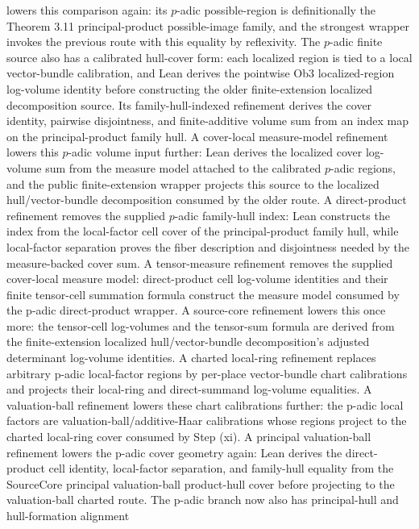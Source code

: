 \begin{proposition}
  lowers this comparison again: its \(p\)-adic possible-region is definitionally
  the Theorem 3.11 principal-product possible-image family, and the strongest
  wrapper invokes the previous route with this equality by reflexivity.  The
  \(p\)-adic finite source also has a calibrated hull-cover form: each
  localized region is tied to a local vector-bundle calibration, and Lean
  derives the pointwise Ob3 localized-region log-volume identity before
  constructing the older finite-extension localized decomposition source.  Its
  family-hull-indexed refinement derives the cover identity, pairwise
  disjointness, and finite-additive volume sum from an index map on the
  principal-product family hull.  A cover-local measure-model refinement lowers
  this \(p\)-adic volume input further: Lean derives the localized cover
  log-volume sum from the measure model attached to the calibrated \(p\)-adic
  regions, and the public finite-extension wrapper projects this source to the
  localized hull/vector-bundle decomposition consumed by the older route.  A
  direct-product refinement removes the supplied \(p\)-adic family-hull index:
  Lean constructs the index from the local-factor cell cover of the
  principal-product family hull, while local-factor separation proves the
  fiber description and disjointness needed by the measure-backed cover sum.
  A tensor-measure refinement removes the supplied cover-local measure model:
  direct-product cell log-volume identities and their finite tensor-cell
  summation formula construct the measure model consumed by the p-adic
  direct-product wrapper.
  A source-core refinement lowers this once more: the tensor-cell log-volumes
  and the tensor-sum formula are derived from the finite-extension localized
  hull/vector-bundle decomposition's adjusted determinant log-volume identities.
  A charted local-ring refinement replaces arbitrary p-adic local-factor
  regions by per-place vector-bundle chart calibrations and projects their
  local-ring and direct-summand log-volume equalities.
  A valuation-ball refinement lowers these chart calibrations further: the
  p-adic local factors are valuation-ball/additive-Haar calibrations whose
  regions project to the charted local-ring cover consumed by Step (xi).
  A principal valuation-ball refinement lowers the p-adic cover geometry again:
  Lean derives the direct-product cell identity, local-factor separation, and
  family-hull equality from the SourceCore principal valuation-ball
  product-hull cover before projecting to the valuation-ball charted route.
  The p-adic branch now also has principal-hull and hull-formation alignment

\end{proposition}
